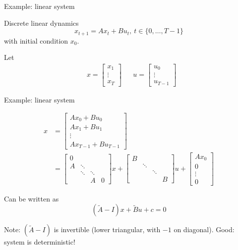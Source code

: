 \begin{frame}{Example: linear system}
\begin{block}{Discrete linear dynamics}
\[
x_{t+1} = A x_t + B u_t, \ t \in \{0, \dots, T-1 \}
\]
with initial condition $x_0$.
\end{block}

Let
\begin{align*}
& x = \left[ \begin{array}{c} x_1 \\ \vdots \\ x_T \end{array}\right] && u = \left[ \begin{array}{c} u_0 \\ \vdots \\ u_{T-1} \end{array}\right]
\end{align*}
%

\end{frame}



\begin{frame}{Example: linear system}

\begin{align*}
x &= 
\left[
\begin{array}{c}
A x_0 + B u_0 \\
A x_1 + B u_1 \\
\vdots \\
A x_{T-1} + B u_{T-1}
\end{array}
\right] \\
& =
\left[
\begin{array}{cccc} 
0 &             &            & \\
A & \ddots &           & \\
   & \ddots & \ddots& \\
   &            & A         & 0 
\end{array}
\right]
x + 
\left[\begin{array}{cccc}
B &             &            & \\
   & \ddots &             & \\
   &             & \ddots & \\
   &             &              &B
\end{array} \right]
u + 
\left[\begin{array}{c}
A x_0 \\
0 \\
\vdots \\
0
\end{array}\right]
\end{align*}

Can be written as 
\[
(\tilde{A} - I)x + \tilde{B} u + c = 0
\]

Note: $(\tilde{A} - I)$ is invertible (lower triangular, with $-1$ on diagonal). Good: system is deterministic!

\end{frame}



